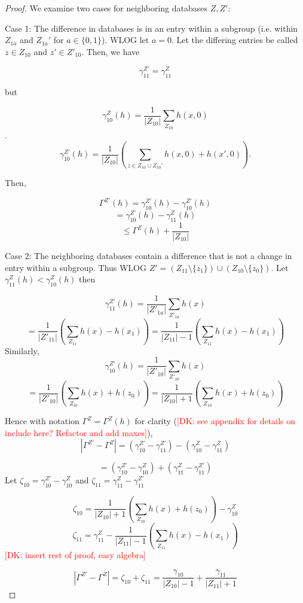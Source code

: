 \documentclass[format = sigconf]{acmart}
\newcommand{\dk}[1]{\textcolor{red}{[DK: #1]}}
\newcommand{\1}{\mathbbm{1}}
\newcommand{\zt}{\zeta}
\newcommand{\gz}[1]{\gamma_{#1}^Z(h)}
\newcommand{\z}[1]{Z_{#1}}
\theoremstyle{definition}
\begin{document}
\begin{proof}
We examine two cases for neighboring databases $Z, Z'$:

Case 1: The difference in databases is in an entry within a subgroup (i.e. within $Z_{1a}$ and $Z_{1a}'$ for $a \in \{0, 1\}$). WLOG let $a = 0$. Let the differing entries be called $z \in \z{10}$ and $z' \in Z'_{10}$. Then, we have

$$\gamma^{Z'}_{11} = \gamma^Z_{11}$$

but

$$\gamma_{10}^Z(h) = \frac{1}{|\z{10}|} \sum_{\z{10}} h(x,0)$$.
$$\gamma_{10}^{Z'}(h) = \frac{1}{|\z{10}|} (\sum_{z \in \z{10} \cup \z{10}'} h(x, 0) + h(x', 0)).$$

Then,

$$ \Gamma^{Z'}(h) = \gamma_{10}^{Z'}(h) - \gamma_{10}^{Z'}(h) $$
$$ = \gamma_{10}^{Z'}(h) - \gz{11} $$
$$ \leq \Gamma^{Z}(h) + \frac{1}{|\z{10}|} $$


Case 2: The neighboring databases contain a difference that is not a change in entry within a subgroup. Thus WLOG $Z' =(Z_{11}\setminus \{z_1\} )\cup( \z{10}\setminus \{z_0\})$. Let $\gamma_{11}^{Z}(h) <\gamma_{10}^{Z}(h)$ then

$$\gamma_{11}^{Z'}(h) = \frac{1}{|Z'_{1a}|} \sum_{Z'_{1a}} h(x)$$
$$= \frac{1}{|Z'_{11}|} (\sum_{Z_{11}} h(x)-h(x_1)) = \frac{1}{|Z_{11}|-1} (\sum_{Z_{11}} h(x)-h(x_1))$$
Similarly,
$$\gamma_{10}^{Z'}(h) = \frac{1}{|Z'_{10}|} \sum_{Z'_{10}} h(x)$$
$$ = \frac{1}{|Z'_{10}|} (\sum_{\z{10}} h(x)+h(z_0))= \frac{1}{|\z{10}|+1} (\sum_{\z{10}} h(x)+h(z_0))$$

Hence with notation $ \Gamma^Z = \Gamma^Z(h)$ for clarity (\dk{see appendix for details on include here? Refactor and add maxes}), $$|\Gamma^{Z'}- \Gamma^{Z}| = (\gamma_{10}^{Z'} - \gamma_{11}^{Z'}) - (\gamma_{10}^{Z} - \gamma_{11}^{Z})$$


$$=(\gamma_{10}^{Z'}- \gamma_{10}^{Z}) + (\gamma_{11}^{Z} -\gamma_{11}^{Z'})$$
Let $\zt_{10}= \gamma_{10}^{Z'}- \gamma_{10}^{Z}$ and  $\zt_{11} = \gamma_{11}^{Z} -\gamma_{11}^{Z'}$

$$\zt_{10} = \frac{1}{|\z{10}|+1} (\sum_{\z{10}} h(x)+h(z_0)) - \gamma_{10}^{Z}$$
$$\zt_{11} = \gamma_{11}^{Z}- \frac{1}{|Z_{11}|-1} (\sum_{Z_{11}} h(x)-h(x_1))$$
\dk {insert rest of proof, easy algebra}

$$|\Gamma^{Z'}- \Gamma^{Z}| = \zt_{10} + \zt_{11}= \frac{\gamma_{10}}{|\z{10}|-1} + \frac{\gamma_{11}}{|Z_{11}|+1} $$
\end{proof}
\end{document}
